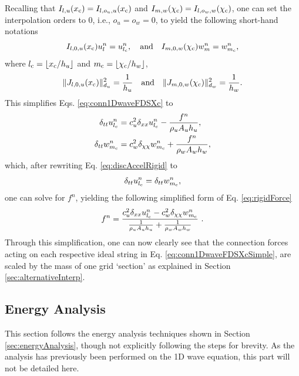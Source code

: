 Recalling that $I_{l, u}(x_{\text{c}}) = I_{l, o_u, u}(x_{\text{c}})$ and $I_{m, w}(\chi_{\text{c}}) = I_{l, o_w, w}(\chi_{\text{c}})$, one can set the interpolation orders to 0, i.e., $o_u = o_w = 0$, to yield the following short-hand notations
\begin{equation}\label{eq:shorthandI}
    I_{l,0,u}(x_\text{c})u_l^n = u_{l_{\text{c}}}^n, \quad \text{and} \quad I_{m,0,w}(\chi_\text{c})w_m^n = w_{m_{\text{c}}}^n,
\end{equation}
where $l_\ctxt = \floor[x_\ctxt/h_u]$ and $m_\ctxt = \floor[\chi_\ctxt/h_w]$,
\begin{equation}\label{eq:shorthandJ}
    \lVert J_{l, 0, u}(x_\text{c})\rVert_{d_u}^2 = \frac{1}{h_u} \quad \text{and} \quad \lVert J_{m, 0, w}(\chi_\text{c})\rVert_{d_w}^2 = \frac{1}{h_w}.
\end{equation}
This simplifies Eqs. \eqref{eq:conn1DwaveFDSXc} to
\begin{subequations}\label{eq:conn1DwaveFDSXcSimple}
    \begin{align}
        \delta_{tt} u_{l_{\text{c}}}^n &= c_u^2 \delta_{xx} u_{l_{\text{c}}}^n -\frac{f^n}{\rho_u A_u h_u}, \label{eq:conn1DwaveuXcSimple} \\
        \delta_{tt} w_{m_{\text{c}}}^n &= c_w^2 \delta_{\chi\chi} w_{m_{\text{c}}}^n + \frac{f^n}{\rho_w A_w h_w},\label{eq:conn1DwavewXcSimple}
    \end{align}
\end{subequations}
which, after rewriting Eq. \eqref{eq:discAccelRigid} to
\begin{equation}
    \delta_{tt}u_{l_{\text{c}}}^n = \delta_{tt}w_{m_{\text{c}}}^n,
\end{equation}
one can solve for $f^n$, yielding the following  simplified form of Eq. \eqref{eq:rigidForce}
\begin{equation}
    f^n = \frac{c_u^2 \delta_{xx} u_{l_{\text{c}}}^n - c_w^2 \delta_{\chi\chi} w_{m_{\text{c}}}^n}{\frac{1}{\rho_u A_u h_u} + \frac{1}{\rho_w A_w h_w}}\ .
\end{equation}
Through this simplification, one can now clearly see that the connection forces acting on each respective ideal string in Eq. \eqref{eq:conn1DwaveFDSXcSimple}, are scaled by the mass of one grid `section'  as explained in Section \ref{sec:alternativeInterp}.

\subsection{Energy Analysis}\label{sec:energyAnalysis1DwaveConnRigid}
This section follows the energy analysis techniques shown in Section \ref{sec:energyAnalysis}, though not explicitly following the steps for brevity. As the analysis has previously been performed on the 1D wave equation, this part will not be detailed here. 

